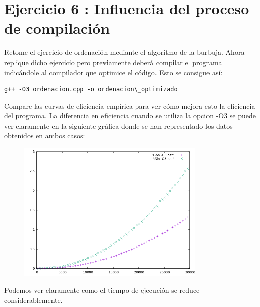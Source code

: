 \documentclass{article}
\begin{document}
\section{Ejercicio 6 : Influencia del proceso de compilación}
Retome el ejercicio de ordenación mediante el algoritmo de la burbuja. Ahora replique
dicho ejercicio pero previamente deberá compilar el programa indicándole al compilador
que optimice el código. Esto se consigue así:
\begin{verbatim}
g++ -O3 ordenacion.cpp -o ordenacion\_optimizado
\end{verbatim}
Compare las curvas de eficiencia empírica para ver cómo mejora esto la eficiencia del programa.
\clearpage
La diferencia en eficiencia cuando se utiliza la opcion -O3 se puede ver claramente en la siguiente gráfica donde se han representado los datos obtenidos en ambos casos: 
\begin{figure}[H]
  \centering
  \includegraphics[width=0.8\textwidth]{comparacion.png}
\end{figure}
Podemos ver claramente como el tiempo de ejecución se reduce considerablemente.
\end{document}
